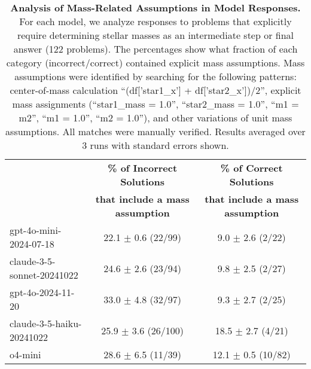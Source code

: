 
\begin{table*}[!htb]
    \centering
    \footnotesize
    \caption{\textbf{Analysis of Mass-Related Assumptions in Model Responses.} 
    For each model, we analyze responses to problems that explicitly require determining stellar masses as an intermediate step or final answer (122 problems). 
    The percentages show what fraction of each category (incorrect/correct) contained explicit mass assumptions. 
    Mass assumptions were identified by searching for the following patterns: center-of-mass calculation ``(df['star1\_x'] + df['star2\_x'])/2'', 
    explicit mass assignments (``star1\_mass = 1.0'', ``star2\_mass = 1.0'', ``m1 = m2'', ``m1 = 1.0'', ``m2 = 1.0''), 
    and other variations of unit mass assumptions. All matches were manually verified. 
    Results averaged over 3 runs with standard errors shown.}\label{tab:mass_assumptions}
    \begin{tabular}{lcc}
    \toprule
    & \textbf{\% of Incorrect Solutions} & \textbf{\% of Correct Solutions} \\
    & \textbf{that include a mass assumption} & \textbf{that include a mass assumption} \\
    \midrule
    gpt-4o-mini-2024-07-18 & 22.1 $\pm$ 0.6 (22/99) & 9.0 $\pm$ 2.6 (2/22) \\
    claude-3-5-sonnet-20241022 & 24.6 $\pm$ 2.6 (23/94) & 9.8 $\pm$ 2.5 (2/27) \\
    gpt-4o-2024-11-20 & 33.0 $\pm$ 4.8 (32/97) & 9.3 $\pm$ 2.7 (2/25) \\
    claude-3-5-haiku-20241022 & 25.9 $\pm$ 3.6 (26/100) & 18.5 $\pm$ 2.7 (4/21) \\
    o4-mini & 28.6 $\pm$ 6.5 (11/39) & 12.1 $\pm$ 0.5 (10/82) \\
    \bottomrule
    \end{tabular}
\end{table*}
